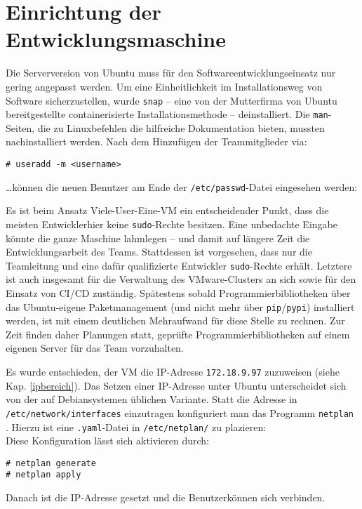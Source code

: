 \section{Einrichtung der Entwicklungsmaschine}
Die Serverversion von Ubuntu muss für den Softwareentwicklungseinsatz nur gering angepasst werden.
Um eine Einheitlichkeit im Installationsweg von Software sicherzustellen, wurde \texttt{snap} -- eine von der Mutterfirma von Ubuntu bereitgestellte containerisierte Installationsmethode -- deinstalliert.
Die \texttt{man}-Seiten, die zu Linuxbefehlen die hilfreiche Dokumentation bieten, mussten nachinstalliert werden.
Nach dem Hinzufügen der Teammitglieder via: 
\begin{verbatim}
# useradd -m <username>
\end{verbatim}
\dots können die neuen Benutzer am Ende der \texttt{/etc/passwd}-Datei eingesehen werden:

Es ist beim Ansatz Viele-User-Eine-VM ein entscheidender Punkt, dass die meisten Entwickler\ggpinnen hier keine \texttt{sudo}-Rechte besitzen.
Eine unbedachte Eingabe könnte die ganze Maschine lahmlegen -- und damit auf längere Zeit die Entwicklungsarbeit des Teams.
Stattdessen ist vorgesehen, dass nur die Teamleitung und eine dafür qualifizierte \mbox{Entwickler\ggpin} \texttt{sudo}-Rechte erhält. Letztere ist auch insgesamt für die Verwaltung des VMware-Clusters an sich sowie für den Einsatz von \acs{CI/CD} zuständig.
Spätestens sobald Programmierbibliotheken über das Ubuntu-eigene Paketmanagement (und nicht mehr über \texttt{pip}/\texttt{pypi}) installiert werden, ist mit einem deutlichen Mehraufwand für diese Stelle zu rechnen. Zur Zeit finden daher Planungen statt, geprüfte Programmierbibliotheken auf einem eigenen Server für das Team vorzuhalten.

Es wurde entschieden, der VM die IP-Adresse \texttt{172.18.9.97} zuzuweisen (siehe Kap. \ref{ipbereich}).
Das Setzen einer IP-Adresse unter Ubuntu unterscheidet sich von der auf Debiansystemen üblichen Variante.
Statt die Adresse in \texttt{/etc/network/interfaces} einzutragen konfiguriert man das Programm \texttt{netplan} \cite{netplan}.
Hierzu ist eine \texttt{.yaml}-Datei in \texttt{/etc/netplan/} zu plazieren:
\\

Diese Konfiguration lässt sich aktivieren durch:
\begin{verbatim}
# netplan generate
# netplan apply
\end{verbatim}
Danach ist die IP-Adresse gesetzt und die Benutzer\gginnen können sich verbinden.

